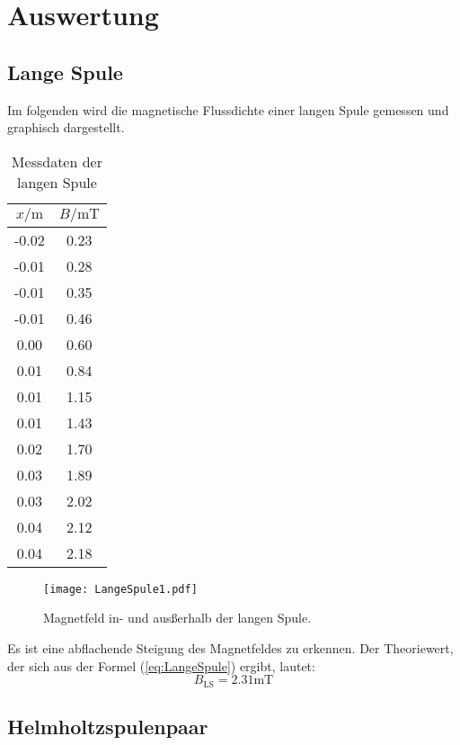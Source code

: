 \section{Auswertung}
\label{sec:Auswertung}

\subsection{Lange Spule}

Im folgenden wird die magnetische Flussdichte einer langen Spule gemessen und graphisch dargestellt.
\begin{table}
\centering
\caption{Messdaten der langen Spule}
  \begin{tabular}{c c}
    \toprule
    $x / \unit\m$ &  $B / \unit{\milli\tesla}$ \\
    \midrule
    -0.02 &         0.23 \\
    -0.01 &         0.28 \\
    -0.01 &         0.35 \\
    -0.01 &         0.46 \\
      0.00 &         0.60 \\
      0.01 &         0.84 \\
      0.01 &         1.15 \\
      0.01 &         1.43 \\
      0.02 &         1.70 \\
      0.03 &         1.89 \\
      0.03 &         2.02 \\
      0.04 &         2.12 \\
      0.04 &         2.18 \\
    \bottomrule
  \end{tabular}
\end{table}

\begin{figure}
  \centering
  \texttt{[image: LangeSpule1.pdf]}
  \caption{Magnetfeld in- und ausßerhalb der langen Spule.}
  \label{fig:LangeSpule1}
\end{figure}

Es ist eine abflachende Steigung des Magnetfeldes zu erkennen. Der Theoriewert, der sich aus der Formel (\ref{eq:LangeSpule}) ergibt, lautet:
\begin{equation}
  B_{\text{LS}} = 2.31 \unit{\milli\tesla}
\end{equation}


\subsection{Helmholtzspulenpaar}

